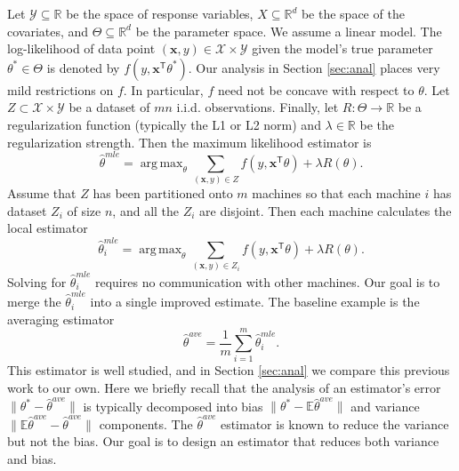 \documentclass[twoside]{article}
\DeclareMathOperator*{\argmax}{arg\,max}
\newcommand{\Y}{\mathcal{Y}}
\newcommand{\X}{\mathcal{X}}
\newcommand{\E}{\mathbb{E}}
\newcommand{\x}{\mathbf{x}}
\newcommand{\w}{\theta}
\newcommand{\wave}{\hat\w^{ave}}
\newcommand{\wmle}{\hat\w^{mle}}
\newcommand{\wstar}{{\w^{*}}}
\newcommand{\trans}[1]{\ensuremath{{#1}^{\mathsf{T}}}}
\newcommand{\ltwo}[1]{{\lVert {#1} \rVert}}
\begin{document}
Let $\Y\subseteq\mathbb{R}$ be the space of response variables,
$X\subseteq\mathbb{R}^d$ be the space of the covariates,
and $\Theta\subseteq\mathbb{R}^d$ be the parameter space.
We assume a linear model.
The log-likelihood of data point $(\x,y)\in\X\times\Y$ given the model's true parameter $\wstar\in\Theta$ is denoted by $f(y,\trans\x\wstar)$.
Our analysis in Section \ref{sec:anal} places very mild restrictions on $f$.
In particular, $f$ need not be concave with respect to $\w$.
Let $Z\subset\X\times\Y$ be a dataset of $mn$ i.i.d. observations.
Finally, let $R : \Theta \to \mathbb{R}$ be a regularization function (typically the L1 or L2 norm)
and $\lambda\in\mathbb{R}$ be the regularization strength.
Then the maximum likelihood estimator is
\begin{equation}
\wmle=\argmax_\w \sum_{(\x,y)\in Z} f(y,\trans\x\w)
+ \lambda R(\theta)
.
\end{equation}
Assume that $Z$ has been partitioned onto $m$ machines so that each machine $i$ has dataset $Z_i$ of size $n$, and all the $Z_i$ are disjoint.
Then each machine calculates the local estimator
\begin{equation}
\wmle_i = \argmax_\w \sum_{(\x,y) \in Z_i} f(y,\trans\x\w)
+ \lambda R(\theta)
.
\end{equation}
Solving for $\wmle_i$ requires no communication with other machines.
Our goal is to merge the $\wmle_i$ into a single improved estimate.
The baseline example is the averaging estimator
\begin{equation}
\wave = \frac{1}{m}\sum_{i=1}^m \wmle_i
.
\end{equation}
This estimator is well studied, and in Section \ref{sec:anal} we compare this previous work to our own.
Here we briefly recall that the analysis of an estimator's error $\ltwo{\wstar-\wave}$ is typically decomposed into bias $\ltwo{\wstar - \E\wave}$ and variance $\ltwo{\E\wave-\wave}$ components.
The $\wave$ estimator is known to reduce the variance but not the bias.
Our goal is to design an estimator that reduces both variance and bias.
\end{document}
